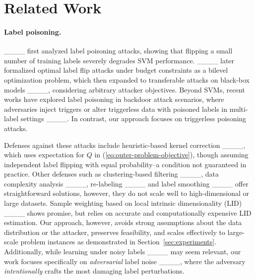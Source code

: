 \section{Related Work}
\label{sec:related-work}

\paragraph{Label poisoning.} 
____ first analyzed label poisoning attacks, showing that flipping a small number of training labels severely degrades SVM performance. 
____ later formalized optimal label flip attacks under budget constraints as a bilevel optimization problem, which then expanded to transferable attacks on black-box models ____, considering arbitrary attacker objectives.
Beyond SVMs, recent works have explored label poisoning in backdoor attack scenarios, where adversaries inject triggers or alter triggerless data with poisoned labels in multi-label settings ____.
In contrast, our approach focuses on triggerless poisoning attacks.

Defenses against these attacks include heuristic-based kernel correction ____, which uses expectation for $Q$ in (\ref{eq:outer-problem-objective}),
though assuming independent label flipping with equal probability--a condition not guaranteed in practice.
Other defenses such as clustering-based filtering ____, data complexity analysis ____, re-labeling ____ and label smoothing ____ offer straightforward solutions, however, they do not scale well to high-dimensional or large datasets.
Sample weighting based on local intrinsic dimensionality (LID) ____ shows promise, but relies on accurate and computationally expensive LID estimation.
Our approach, however, avoids strong assumptions about the data distribution or the attacker, preserves feasibility, and scales effectively to large-scale problem instances as demonstrated in Section~\ref{sec:experiments}. 
Additionally, while learning under noisy labels ____ may seem relevant,
our work focuses specifically on \textit{adversarial} label noise ____, where the adversary \textit{intentionally} crafts the most damaging label perturbations. 
\vspace{-0.2cm}
